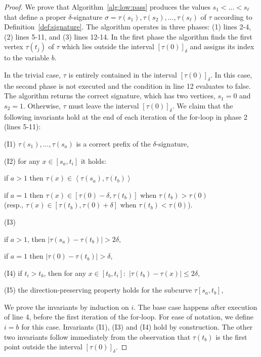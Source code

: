 \documentclass[11pt, letter]{article}
\newcommand{\defref}[1]{Definition~\ref{def:#1}}
\newcommand{\algref}[1]{Algorithm~\ref{alg:#1}}
\providecommand{\cbrc}[1]{\left\langle{#1}\right\rangle}
\newcommand{\lenClusters}{\ensuremath{\ell}}
\newcommand{\range}[2]{\ensuremath{[#1]_{#2}}}
\begin{document}
\begin{proof}
We prove that \algref{low:pass} produces the values $s_1<\ldots <
s_\lenClusters$ that define a proper $\delta$-signature
$\sigma=\tau(s_1),\tau(s_2),\dots,\tau(s_{\lenClusters})$ of $\tau$ according to
\defref{signature}.  The algorithm operates in three phases: (1) lines 2-4, (2)
lines 5-11, and (3) lines 12-14. In the first phase the algorithm finds the
first vertex $\tau(t_j)$ of $\tau$ which lies outside the interval
$\range{\tau(0)}{\delta}$ and assigns its index to the variable $b$. 

In the trivial case, $\tau$ is entirely contained in the interval
$\range{\tau(0)}{\delta}$. In this case, the second phase is not executed and
the condition in line 12 evaluates to false. The algorithm returns the correct
signature, which has two vertices, $s_1=0$ and $s_2=1$.
Otherwise, $\tau$ must leave the interval $\range{\tau(0)}{\delta}$.
We claim that the following invariants hold at the end of each iteration of the for-loop in phase 2 (lines 5-11):
\begin{compactitem}
\item[(I1)]  $\tau(s_1),\dots,\tau(s_a)$ is a correct prefix of the $\delta$-signature,
\item[(I2)]  for any $x\in [s_a,t_i]$ it holds: 
\begin{compactenum}[(a)] 
\item if $a>1$ then $\tau(x) \in \cbrc{\tau(s_a),\tau(t_b)}$
\item if $a=1$ then $\tau(x) \in [\tau(0)-\delta,\tau(t_b)]$ when
$\tau(t_b)>\tau(0)$\\ (resp., $\tau(x) \in [\tau(t_b),\tau(0)+\delta]$ when
$\tau(t_b)<\tau(0)$).
\end{compactenum}
\item[(I3)]  \begin{compactenum}[(a)]
\item if $a>1$, then $|\tau(s_a)-\tau(t_b)|>2\delta$,
\item if $a=1$ then $|\tau(0)-\tau(t_b)|>\delta$,
\end{compactenum}
\item[(I4)]  if $t_i>t_b$, then for any $x \in [t_b, t_i]:$ $|\tau(t_b)-\tau(x)|\leq 2 \delta$,
\item[(I5)]  the direction-preserving property holds for the subcurve $\tau[s_a,t_b]$,
\end{compactitem}
We prove the invariants by induction on $i$. The base case happens after execution of
line 4, before the first iteration of the for-loop. For ease of notation, we
define $i=b$ for this case. Invariants (I1), (I3) and (I4) hold by construction.
The other two invariants follow immediately from the observation that
$\tau(t_b)$ is the first point outside the interval $\range{\tau(0)}{\delta}$.



\end{proof}
\end{document}
